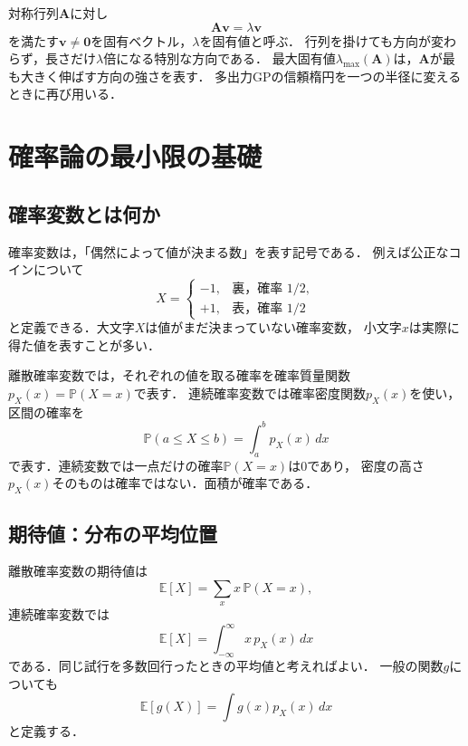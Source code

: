\documentclass[a4paper,11pt]{ltjsarticle}
\newcommand{\E}{\mathbb E}
\newcommand{\Pp}{\mathbb P}
\begin{document}
対称行列\(\bm A\)に対し
\begin{equation}
  \bm A\bm v=\lambda\bm v
\end{equation}
を満たす\(\bm v\neq\bm0\)を固有ベクトル，\(\lambda\)を固有値と呼ぶ．
行列を掛けても方向が変わらず，長さだけ\(\lambda\)倍になる特別な方向である．
最大固有値\(\lambda_{\max}(\bm A)\)は，\(\bm A\)が最も大きく伸ばす方向の強さを表す．
多出力GPの信頼楕円を一つの半径に変えるときに再び用いる．

\section{確率論の最小限の基礎}
\label{sec:probability}

\subsection{確率変数とは何か}

確率変数は，「偶然によって値が決まる数」を表す記号である．
例えば公正なコインについて
\begin{equation}
  X=
  \begin{cases}
    -1,&\text{裏，確率 }1/2,\\
    +1,&\text{表，確率 }1/2
  \end{cases}
\end{equation}
と定義できる．大文字\(X\)は値がまだ決まっていない確率変数，
小文字\(x\)は実際に得た値を表すことが多い．

離散確率変数では，それぞれの値を取る確率を確率質量関数\(p_X(x)=\Pp(X=x)\)で表す．
連続確率変数では確率密度関数\(p_X(x)\)を使い，区間の確率を
\begin{equation}
  \Pp(a\leq X\leq b)=\int_a^b p_X(x)\,dx
\end{equation}
で表す．連続変数では一点だけの確率\(\Pp(X=x)\)は0であり，
密度の高さ\(p_X(x)\)そのものは確率ではない．面積が確率である．

\subsection{期待値：分布の平均位置}

離散確率変数の期待値は
\begin{equation}
  \E[X]=\sum_x x\,\Pp(X=x),
  \label{eq:discrete-expectation}
\end{equation}
連続確率変数では
\begin{equation}
  \E[X]=\int_{-\infty}^{\infty}x\,p_X(x)\,dx
  \label{eq:continuous-expectation}
\end{equation}
である．同じ試行を多数回行ったときの平均値と考えればよい．
一般の関数\(g\)についても
\begin{equation}
  \E[g(X)]
  =\int g(x)p_X(x)\,dx
\end{equation}
と定義する．
\end{document}
